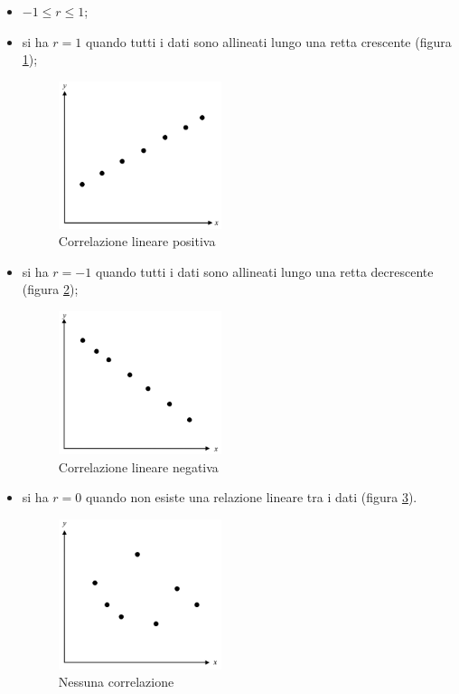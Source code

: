 \begin{itemize}
  \item $-1 \le r \le 1$;
  \item si ha $r=1$ quando tutti i dati sono allineati lungo una retta crescente (figura \ref{fig:positive_correlation});
    \begin{figure}[H]
\centering
\includegraphics[width=0.45\textwidth,height=\textheight,keepaspectratio]{img/positive_correlation.png}
\caption{Correlazione lineare positiva}
\label{fig:positive_correlation}
\end{figure}

  \item si ha $r=-1$ quando tutti i dati sono allineati lungo una retta decrescente  (figura \ref{fig:negative_correlation});
      \begin{figure}[H]
\centering
\includegraphics[width=0.45\textwidth,height=\textheight,keepaspectratio]{img/negative_correlation.png}
\caption{Correlazione lineare negativa}
\label{fig:negative_correlation}
\end{figure}
  \item si ha $r=0$ quando non esiste una relazione lineare tra i dati  (figura \ref{fig:no_correlation}).
  \begin{figure}[H]
\centering
\includegraphics[width=0.45\textwidth,height=\textheight,keepaspectratio]{img/no_correlation.png}
\caption{Nessuna correlazione}
\label{fig:no_correlation}
\end{figure}
\end{itemize}

